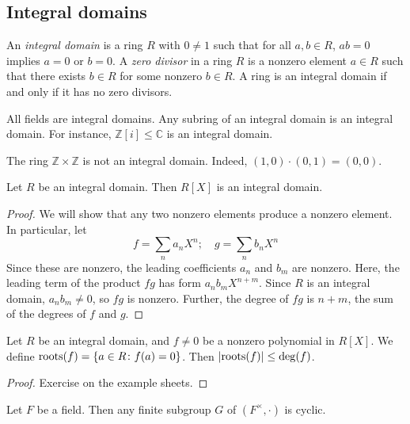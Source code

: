 \subsection{Integral domains}
\begin{definition}
	An \textit{integral domain} is a ring \( R \) with \( 0 \neq 1 \) such that for all \( a, b \in R \), \( a b = 0 \) implies \( a = 0 \) or \( b = 0 \).
	A \textit{zero divisor} in a ring \( R \) is a nonzero element \( a \in R \) such that there exists \( b \in R \) for some nonzero \( b \in R \).
	A ring is an integral domain if and only if it has no zero divisors.
\end{definition}
\begin{example}
	All fields are integral domains.
	Any subring of an integral domain is an integral domain.
	For instance, \( \mathbb Z[i] \leq \mathbb C \) is an integral domain.
\end{example}
\begin{example}
	The ring \( \mathbb Z \times \mathbb Z \) is not an integral domain.
	Indeed, \( (1,0) \cdot (0,1) = (0,0) \).
\end{example}
\begin{lemma}
	Let \( R \) be an integral domain.
	Then \( R[X] \) is an integral domain.
\end{lemma}
\begin{proof}
	We will show that any two nonzero elements produce a nonzero element.
	In particular, let
	\[
		f = \sum_n a_n X^n;\quad g = \sum_n b_n X^n
	\]
	Since these are nonzero, the leading coefficients \( a_n \) and \( b_m \) are nonzero.
	Here, the leading term of the product \( fg \) has form \( a_n b_m X^{n+m} \).
	Since \( R \) is an integral domain, \( a_n b_m \neq 0 \), so \( fg \) is nonzero.
	Further, the degree of \( fg \) is \( n + m \), the sum of the degrees of \( f \) and \( g \).
\end{proof}
\begin{lemma}
	Let \( R \) be an integral domain, and \( f \neq 0 \) be a nonzero polynomial in \( R[X] \).
	We define \( \mathrm{roots}(f) = \qty{a \in R \colon f(a) = 0} \).
	Then \( \abs{\mathrm{roots}(f)} \leq \mathrm{deg}(f) \).
\end{lemma}
\begin{proof}
	Exercise on the example sheets.
\end{proof}
\begin{theorem}
	Let \( F \) be a field.
	Then any finite subgroup \( G \) of \( (F^\times, \cdot) \) is cyclic.
\end{theorem}
